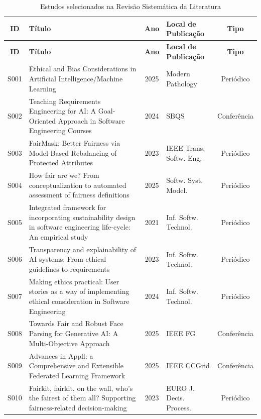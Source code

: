 


\begin{longtable}{|c|p{7cm}|c|p{3.5cm}|c|}
\caption{Estudos selecionados na Revisão Sistemática da Literatura}
\label{estudos}\\
\hline
\textbf{ID} & \textbf{Título} & \textbf{Ano} & \textbf{Local de Publicação} & \textbf{Tipo} \\ \hline   
\endfirsthead
\hline
\textbf{ID} & \textbf{Título} & \textbf{Ano} & \textbf{Local de Publicação} & \textbf{Tipo} \\ \hline
\endhead
\hline
\endfoot
S001 & Ethical and Bias Considerations in Artificial Intelligence/Machine Learning & 2025 & Modern Pathology & Periódico \\ \hline
S002 & Teaching Requirements Engineering for AI: A Goal-Oriented Approach in Software Engineering Courses & 2024 & SBQS & Conferência \\ \hline
S003 & FairMask: Better Fairness via Model-Based Rebalancing of Protected Attributes & 2023 & IEEE Trans. Softw. Eng. & Periódico \\ \hline
S004 & How fair are we? From conceptualization to automated assessment of fairness definitions & 2025 & Softw. Syst. Model. & Periódico \\ \hline
S005 & Integrated framework for incorporating sustainability design in software engineering life-cycle: An empirical study & 2021 & Inf. Softw. Technol. & Periódico \\ \hline
S006 & Transparency and explainability of AI systems: From ethical guidelines to requirements & 2023 & Inf. Softw. Technol. & Periódico \\ \hline
S007 & Making ethics practical: User stories as a way of implementing ethical consideration in Software Engineering & 2024 & Inf. Softw. Technol. & Periódico \\ \hline
S008 & Towards Fair and Robust Face Parsing for Generative AI: A Multi-Objective Approach & 2025 & IEEE FG & Conferência \\ \hline
S009 & Advances in Appfl: a Comprehensive and Extensible Federated Learning Framework & 2025 & IEEE CCGrid & Conferência \\ \hline
S010 & Fairkit, fairkit, on the wall, who's the fairest of them all? Supporting fairness-related decision-making & 2023 & EURO J. Decis. Process. & Periódico \\ \hline

\end{longtable}
